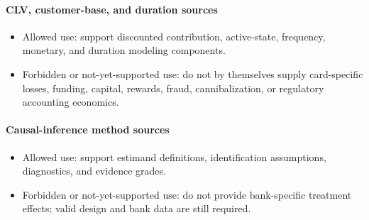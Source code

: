 \documentclass[11pt]{article}
\newcommand{\1}{\mathbf{1}}
\newcommand{\contractitem}[2]{\paragraph{#1}\begin{itemize}[leftmargin=1.5em,itemsep=0.12em,topsep=0.18em]#2\end{itemize}}
\begin{document}
\contractitem{CLV, customer-base, and duration sources}{
  \item Allowed use: support discounted contribution, active-state, frequency,
        monetary, and duration modeling components.
  \item Forbidden or not-yet-supported use: do not by themselves supply
        card-specific losses, funding, capital, rewards, fraud,
        cannibalization, or regulatory accounting economics.
}
\contractitem{Causal-inference method sources}{
  \item Allowed use: support estimand definitions, identification assumptions,
        diagnostics, and evidence grades.
  \item Forbidden or not-yet-supported use: do not provide bank-specific
        treatment effects; valid design and bank data are still required.
}



\end{document}
